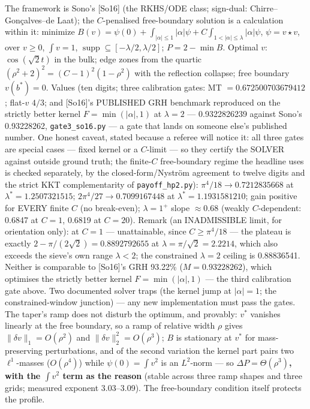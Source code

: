 \documentclass[11pt]{amsart}
\newcommand{\supp}{\operatorname{supp}}
\theoremstyle{plain}
\theoremstyle{remark}
\begin{document}
The framework is Sono's [So16] (the RKHS/ODE class; sign-dual:
Chirre--Gon\c{c}alves--de Laat); the $C$-penalised free-boundary solution is a
calculation within it: minimize
$B(v) = \psi(0) + \int_{|\alpha|\le1}|\alpha|\psi + C\int_{1<|\alpha|\le\lambda}
|\alpha|\psi$, $\psi = v\star v$, over $v \ge 0$, $\int v = 1$,
$\supp \subseteq [-\lambda/2, \lambda/2]$; $P = 2 - \min B$. Optimal $v$:
$\cos(\sqrt{2}t)$ in the bulk; edge zones from the quartic
$(\rho^2 + 2)^2 = (C-1)^2(1 - \rho^2)$ with the reflection collapse; free boundary
$v(b^*) = 0$. Values (ten digits; three calibration gates: MT $= 0.672500703679412$;
flat-$v$ $4/3$; and [So16]'s PUBLISHED GRH benchmark reproduced on the strictly
better kernel $F = \min(|\alpha|, 1)$ at $\lambda = 2$ --- 0.9322826239 against
Sono's 0.93228262, \texttt{gate3\_so16.py} --- a gate that lands on someone else's
published number. One honest caveat, stated because a referee will notice it: all
three gates are special cases --- fixed kernel or a $C$-limit --- so they certify the
SOLVER against outside ground truth; the finite-$C$ free-boundary regime the headline
uses is checked separately, by the closed-form/Nystr\"om agreement to twelve digits
and the strict KKT complementarity of \texttt{payoff\_hp2.py}):
$\pi^4/18 \to 0.7212835668$ at $\lambda^* = 1.2507321515$;
$2\pi^4/27 \to 0.7099167448$ at $\lambda^* = 1.1931581210$; gain positive for EVERY
finite $C$ (no break-even); $\lambda = 1^{+}$ slope $\approx 0.68$ (weakly
$C$-dependent: 0.6847 at $C = 1$, 0.6819 at $C = 20$). Remark (an INADMISSIBLE
limit, for orientation only): at $C = 1$ --- unattainable, since $C \ge \pi^4/18$ ---
the plateau is exactly $2 - \pi/(2\sqrt{2}) = 0.8892792655$ at
$\lambda = \pi/\sqrt{2} = 2.2214$, which also exceeds the sieve's own range
$\lambda < 2$; the constrained $\lambda = 2$ ceiling is 0.88836541. Neither is
comparable to [So16]'s GRH 93.22\% ($M = 0.93228262$), which optimises the strictly
better kernel $F = \min(|\alpha|, 1)$ --- the third calibration gate above. Two
documented solver traps (the kernel jump at $|\alpha| = 1$; the constrained-window
junction) --- any new implementation must pass the gates. The taper's ramp does not
disturb the optimum, and provably: $v^*$ vanishes linearly at the free boundary, so a
ramp of relative width $\rho$ gives $\lVert\delta v\rVert_1 = O(\rho^2)$ and
$\lVert\delta v\rVert_2^2 = O(\rho^3)$; $B$ is stationary at $v^*$ for
mass-preserving perturbations, and of the second variation the kernel part pairs two
$\ell^1$-masses ($O(\rho^4)$) while $\psi(0) = \int v^2$ is an $L^2$-norm --- so
\textbf{\boldmath$\Delta P = \Theta(\rho^3)$, with the $\int v^2$ term as the
reason} (stable across three ramp shapes and three grids; measured exponent
3.03--3.09). The free-boundary condition itself protects the profile.
\end{document}
